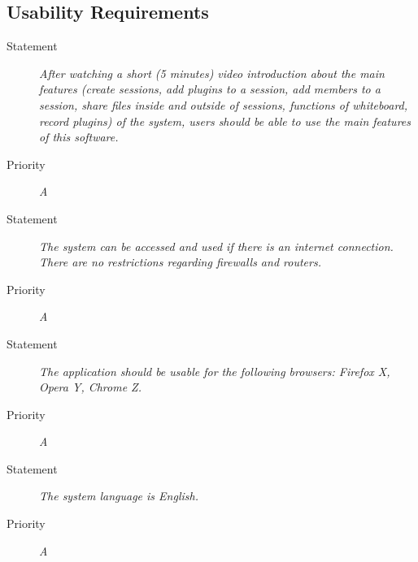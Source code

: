 \subsection{Usability Requirements}

\NFR
\begin{description}
\item[Statement] \textit{After watching a short (5 minutes) video introduction about the
    main features (create sessions, add plugins to a session, add
    members to a session, share files inside and outside of sessions,
    functions of whiteboard, record plugins) of the system, users
    should be able to use the main features of this software.}
\item[Priority] \textit{A}
\end{description}

\NFR
\begin{description}
\item[Statement] \textit{The system can be accessed and used if there is an
    internet connection. There are no restrictions regarding firewalls and
    routers.}
\item[Priority] \textit{A}
\end{description}

\NFR
\begin{description}
\item[Statement] \textit{The application should be usable for the following
    browsers: Firefox X, Opera Y, Chrome Z.}
\item[Priority] \textit{A}
\end{description}

\NFR
\begin{description}
\item[Statement] \textit{The system language is English.}
\item[Priority] \textit{A}
\end{description}